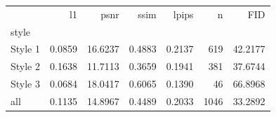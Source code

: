 \begin{tabular}{lrrrrrr}
\toprule
 & l1 & psnr & ssim & lpips & n & FID \\
style &  &  &  &  &  &  \\
\midrule
Style 1 & 0.0859 & 16.6237 & 0.4883 & 0.2137 & 619 & 42.2177 \\
Style 2 & 0.1638 & 11.7113 & 0.3659 & 0.1941 & 381 & 37.6744 \\
Style 3 & 0.0684 & 18.0417 & 0.6065 & 0.1390 & 46 & 66.8968 \\
all & 0.1135 & 14.8967 & 0.4489 & 0.2033 & 1046 & 33.2892 \\
\bottomrule
\end{tabular}
